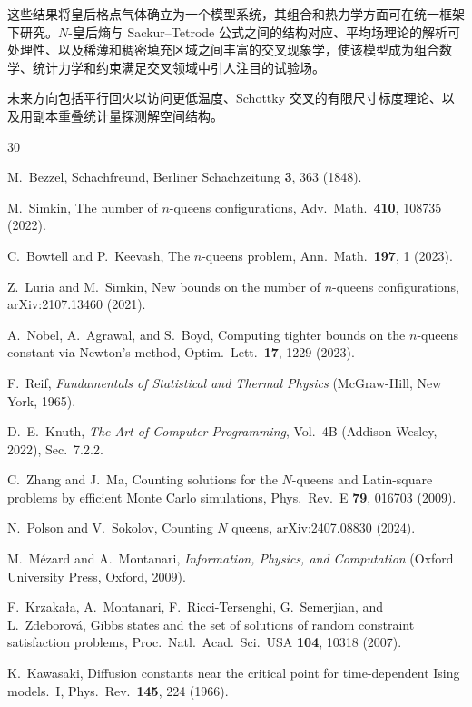 \documentclass[aps, pre, reprint, amsmath, amssymb, superscriptaddress, floatfix]{revtex4-2}
\begin{document}
这些结果将皇后格点气体确立为一个模型系统，其组合和热力学方面可在统一框架下研究。$N$-皇后熵与 Sackur--Tetrode 公式之间的结构对应、平均场理论的解析可处理性、以及稀薄和稠密填充区域之间丰富的交叉现象学，使该模型成为组合数学、统计力学和约束满足交叉领域中引人注目的试验场。

未来方向包括平行回火以访问更低温度、Schottky 交叉的有限尺寸标度理论、以及用副本重叠统计量探测解空间结构。


\begin{thebibliography}{30}

M.~Bezzel,
Schachfreund, Berliner Schachzeitung \textbf{3}, 363 (1848).

M.~Simkin,
The number of $n$-queens configurations,
Adv.\ Math.\ \textbf{410}, 108735 (2022).

C.~Bowtell and P.~Keevash,
The $n$-queens problem,
Ann.\ Math.\ \textbf{197}, 1 (2023).

Z.~Luria and M.~Simkin,
New bounds on the number of $n$-queens configurations,
arXiv:2107.13460 (2021).

A.~Nobel, A.~Agrawal, and S.~Boyd,
Computing tighter bounds on the $n$-queens constant via Newton's
method,
Optim.\ Lett.\ \textbf{17}, 1229 (2023).

F.~Reif,
\textit{Fundamentals of Statistical and Thermal Physics}
(McGraw-Hill, New York, 1965).

D.~E.~Knuth,
\textit{The Art of Computer Programming}, Vol.~4B
(Addison-Wesley, 2022), Sec.~7.2.2.

C.~Zhang and J.~Ma,
Counting solutions for the $N$-queens and Latin-square problems by
efficient Monte Carlo simulations,
Phys.\ Rev.\ E \textbf{79}, 016703 (2009).

N.~Polson and V.~Sokolov,
Counting $N$ queens,
arXiv:2407.08830 (2024).

M.~M\'ezard and A.~Montanari,
\textit{Information, Physics, and Computation}
(Oxford University Press, Oxford, 2009).

F.~Krzaka{\l}a, A.~Montanari, F.~Ricci-Tersenghi,
G.~Semerjian, and L.~Zdeborov\'a,
Gibbs states and the set of solutions of random constraint
satisfaction problems,
Proc.\ Natl.\ Acad.\ Sci.\ USA \textbf{104}, 10318 (2007).

K.~Kawasaki,
Diffusion constants near the critical point for time-dependent Ising
models.\ I,
Phys.\ Rev.\ \textbf{145}, 224 (1966).


\end{thebibliography}
\end{document}
